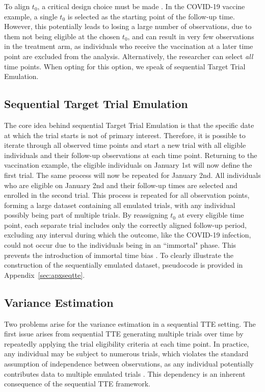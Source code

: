 \documentclass[pdflatex,sn-vancouver-ay]{sn-jnl}%
\theoremstyle{thmstyleone}%
\theoremstyle{thmstyletwo}%
\theoremstyle{thmstylethree}%
\begin{document}
To align $t_0$, a critical design choice must be made \citep{fuStartingRightAligning2025}. In the COVID-19 vaccine example, a single $t_0$ is selected as the starting point of the follow-up time. However, this potentially leads to losing a large number of observations, due to them not being eligible at the chosen $t_0$, and can result in very few observations in the treatment arm, as individuals who receive the vaccination at a later time point are excluded from the analysis. Alternatively, the researcher can select \emph{all} time points. When opting for this option, we speak of sequential Target Trial Emulation.


\subsection{Sequential Target Trial Emulation}
The core idea behind sequential Target Trial Emulation is that the specific date at which the trial starts is not of primary interest. Therefore, it is possible to iterate through all observed time points and start a new trial with all eligible individuals and their follow-up observations at each time point. Returning to the vaccination example, the eligible individuals on January 1st will now define the first trial. The same process will now be repeated for January 2nd. All individuals who are eligible on January 2nd and their follow-up times are selected and enrolled in the second trial. This process is repeated for all observation points, forming a large dataset containing all emulated trials, with any individual possibly being part of multiple trials. By reassigning $t_0$ at every eligible time point, each separate trial includes only the correctly aligned follow-up period, excluding any interval during which the outcome, like the COVID-19 infection, could not occur due to the individuals being in an ``immortal" phase. This prevents the introduction of immortal time bias \citep{hernanStructuralDescriptionBiases2025, hernanTargetTrialFramework2025}. To clearly illustrate the construction of the sequentially emulated dataset, pseudocode is provided in Appendix~\ref{sec:apxseqtte}.

\subsection{Variance Estimation}\label{VarEst}

Two problems arise for the variance estimation in a sequential TTE setting. The first issue arises from sequential TTE generating multiple trials over time by repeatedly applying the trial eligibility criteria at each time point. In practice, any individual may be subject to numerous trials, which violates the standard assumption of independence between observations, as any individual potentially contributes data to multiple emulated trials \citep{hernanUsingBigData2016}. This dependency is an inherent consequence of the sequential TTE framework.
\end{document}
